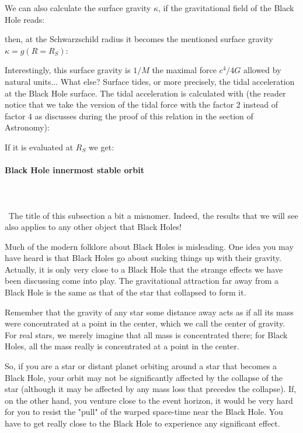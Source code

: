 	We can also calculate the surface gravity $\kappa$, if the gravitational field of the Black Hole reads:
	
	then, at the Schwarzschild radius it becomes the mentioned surface gravity $\kappa=g(R=R_S)$:
	
	Interestingly, this surface gravity is $1/M$ the maximal force $c^4/4G$ allowed by natural units... What else? Surface tides, or more precisely, the tidal acceleration at the Black Hole surface. The tidal acceleration is calculated with (the reader notice that we take the version of the tidal force with the factor $2$ instead of factor $4$ as discusses during the proof of this relation in the section of Astronomy):
	
	If it is evaluated at $R_S$ we get:
	
	
	\paragraph{Black Hole innermost stable orbit}\mbox{}\\\\\
	The title of this subsection a bit a misnomer. Indeed, the results that we will see also applies to any other object that Black Holes!
	
	Much of the modern folklore about Black Holes is misleading. One idea you may have heard is that Black Holes go about sucking things up with their gravity. Actually, it is only very close to a Black Hole that the strange effects we have been discussing come into play. The gravitational attraction far away from a Black Hole is the same as that of the star that collapsed to form it.

	Remember that the gravity of any star some distance away acts as if all its mass were concentrated at a point in the center, which we call the center of gravity. For real stars, we merely imagine that all mass is concentrated there; for Black Holes, all the mass really is concentrated at a point in the center.

	So, if you are a star or distant planet orbiting around a star that becomes a Black Hole, your orbit may not be significantly affected by the collapse of the star (although it may be affected by any mass loss that precedes the collapse). If, on the other hand, you venture close to the event horizon, it would be very hard for you to resist the "pull" of the warped space-time near the Black Hole. You have to get really close to the Black Hole to experience any significant effect.

